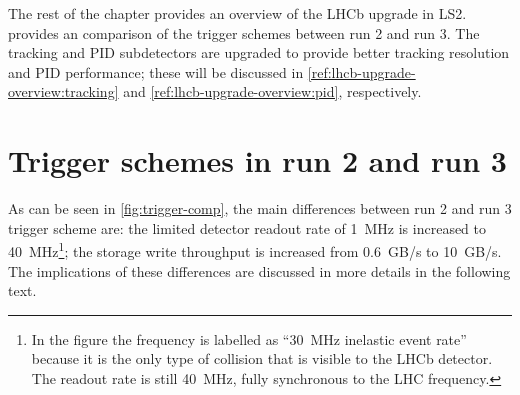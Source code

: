 The rest of the chapter provides an overview of the LHCb upgrade in LS2.
provides an comparison of the trigger schemes between run 2 and run 3.
The tracking and PID subdetectors are upgraded to provide better tracking
resolution and PID performance;
these will be discussed in \cref{ref:lhcb-upgrade-overview:tracking} and
\cref{ref:lhcb-upgrade-overview:pid}, respectively.


\section{Trigger schemes in run 2 and run 3}
\label{ref:lhcb-upgrade-overview:trigger}

As can be seen in \cref{fig:trigger-comp},
the main differences between run 2 and run 3 trigger scheme are:
the limited detector readout rate of 1~MHz is increased to 40~MHz\footnote{
    In the figure the frequency is labelled as ``30~MHz inelastic event rate''
    because it is the only type of collision that is visible to the LHCb
    detector.
    The readout rate is still 40~MHz, fully synchronous to the LHC frequency.
};
the storage write throughput is increased from 0.6~GB/s to 10~GB/s.
The implications of these differences are discussed in more details in the
following text.

